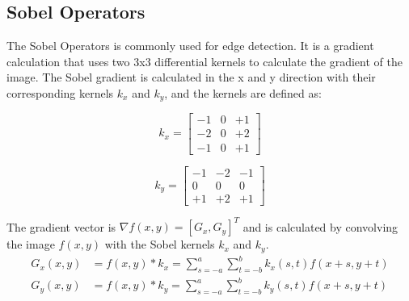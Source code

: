 \subsection{Sobel Operators}
The Sobel Operators \cite{gonzalez_sharpening_nodate} is commonly used for edge detection. It is a gradient calculation that uses two 3x3 differential kernels to calculate the gradient of the image. The Sobel gradient is calculated in the x and y direction with their corresponding kernels $k_x$ and $k_y$, and the kernels are defined as:
\begin{center}
    \begin{minipage}{0.44\textwidth}
        \begin{equation}
            k_x = \begin{bmatrix}
                -1 & 0 & +1 \\
                -2 & 0 & +2 \\
                -1 & 0 & +1
            \end{bmatrix} 
        \end{equation}
    \end{minipage}
    \hfill
    \begin{minipage}{0.44\textwidth}
        \begin{equation}
            k_y = \begin{bmatrix}
                -1 & -2 & -1 \\
                0 & 0 & 0 \\
                +1 & +2 & +1
            \end{bmatrix} 
        \end{equation}
         
    \end{minipage}
    
\end{center}
     The gradient vector is $\nabla f(x,y) = [G_x, G_y]^T$  and is calculated by convolving the image $f(x,y)$ with the Sobel kernels $k_x$ and $k_y$.
     \begin{align}
        G_x(x,y) & = f(x,y) * k_x  = \sum_{s=-a}^{a} \sum_{t=-b}^{b} k_x(s,t) f(x+s,y+t) \\
        G_y(x,y) & = f(x,y) * k_y  = \sum_{s=-a}^{a} \sum_{t=-b}^{b} k_y(s,t) f(x+s,y+t)
    \end{align}
     
